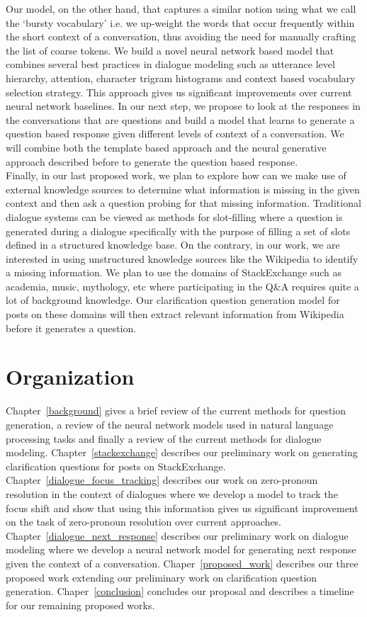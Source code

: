 \documentclass[11pt]{report}
\renewcommand\cite{\citep}	%
\begin{document}
\noindent
Our model, on the other hand, that captures a similar notion using what we call the `bursty vocabulary' i.e. we up-weight the words that occur frequently within the short context of a conversation, thus avoiding the need for manually crafting the list of coarse tokens. We build a novel neural network based model that combines several best practices in dialogue modeling such as utterance level hierarchy, attention, character trigram histograms and context based vocabulary selection strategy. This approach gives us significant improvements over current neural network baselines. In our next step, we propose to look at the responses in the conversations that are questions and build a model that learns to generate a question based response given different levels of context of a conversation. We will combine both the template based approach and the neural generative approach described before to generate the question based response. \\

\noindent
Finally, in our last proposed work, we plan to explore how can we make use of external knowledge sources to determine what information is missing in the given context and then ask a question probing for that missing information. Traditional dialogue systems \cite{lemon2006isu} can be viewed as methods for slot-filling where a question is generated during a dialogue specifically with the purpose of filling a set of slots defined in a structured knowledge base. On the contrary, in our work, we are interested in using unstructured knowledge sources like the Wikipedia to identify a missing information. We plan to use the domains of StackExchange such as academia, music, mythology, etc where participating in the Q\&A requires quite a lot of background knowledge. Our clarification question generation model for posts on these domains will then extract relevant information from Wikipedia before it generates a question. 

\section{Organization}

Chapter~\ref{background} gives a brief review of the current methods for question generation, a review of the neural network models used in natural language processing tasks and finally a review of the current methods for dialogue modeling. Chapter~\ref{stackexchange} describes our preliminary work on generating clarification questions for posts on StackExchange. Chapter~\ref{dialogue_focus_tracking} describes our work on zero-pronoun resolution in the context of dialogues where we develop a model to track the focus shift and show that using this information gives us significant improvement on the task of zero-pronoun resolution over current approaches. Chapter~\ref{dialogue_next_response} describes our preliminary work on dialogue modeling where we develop a neural network model for generating next response given the context of a conversation. Chaper~\ref{proposed_work} describes our three proposed work extending our preliminary work on clarification question generation. Chaper~\ref{conclusion} concludes our proposal and describes a timeline for our remaining proposed works.
\end{document}
